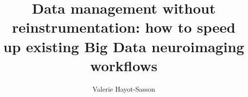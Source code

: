 \author{Valerie Hayot-Sasson}
\title{Data management without reinstrumentation: how to speed up existing Big Data neuroimaging workflows}

